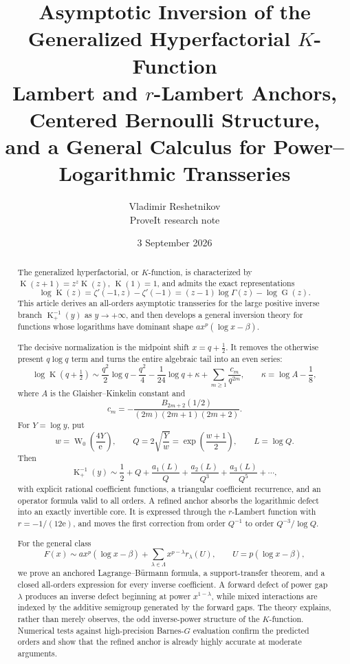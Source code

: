 \documentclass[11pt,oneside]{article}
\theoremstyle{plain}
\theoremstyle{definition}
\theoremstyle{remark}
\newcommand{\Kfun}{\operatorname{K}}
\newcommand{\Gfun}{\operatorname{G}}
\newcommand{\W}{\operatorname{W}}
\newcommand{\e}{\mathrm{e}}
\begin{document}
\title{\textbf{Asymptotic Inversion of the Generalized Hyperfactorial \(K\)-Function}\\[0.4em]
  \Large Lambert and \(r\)-Lambert Anchors, Centered Bernoulli Structure,\\
  and a General Calculus for Power--Logarithmic Transseries}
\author{Vladimir Reshetnikov\\
  \small ProveIt research note}
\date{3 September 2026}
\maketitle

\begin{abstract}
The generalized hyperfactorial, or \(K\)-function, is characterized by
\(\Kfun(z+1)=z^z\Kfun(z)\), \(\Kfun(1)=1\), and admits the exact representations
\[
 \log\Kfun(z)=\zeta'(-1,z)-\zeta'(-1)
 =(z-1)\log\Gamma(z)-\log\Gfun(z).
\]
This article derives an all-orders asymptotic transseries for the large positive
inverse branch \(\Kfun_+^{-1}(y)\) as \(y\to+\infty\), and then develops a
general inversion theory for functions whose logarithms have dominant shape
\(a x^p(\log x-\beta)\).

The decisive normalization is the midpoint shift \(x=q+\tfrac12\).  It removes
the otherwise present \(q\log q\) term and turns the entire algebraic tail into
an even series:
\[
 \log\Kfun\!\left(q+\tfrac12\right)
 \sim \frac{q^2}{2}\log q-\frac{q^2}{4}
      -\frac1{24}\log q+\kappa
      +\sum_{m\ge1}\frac{c_m}{q^{2m}},
 \qquad \kappa=\log A-\frac18,
\]
where \(A\) is the Glaisher--Kinkelin constant and
\[
 c_m=-\frac{B_{2m+2}(1/2)}{(2m)(2m+1)(2m+2)}.
\]
For \(Y=\log y\), put
\[
 w=\W_0\!\left(\frac{4Y}{\e}\right),\qquad
 Q=2\sqrt{\frac{Y}{w}}=\exp\!\left(\frac{w+1}{2}\right),
 \qquad L=\log Q.
\]
Then
\[
 \Kfun_+^{-1}(y)
 \sim \frac12+Q+\frac{a_1(L)}{Q}
 +\frac{a_2(L)}{Q^3}+\frac{a_3(L)}{Q^5}+\cdots,
\]
with explicit rational coefficient functions, a triangular coefficient
recurrence, and an operator formula valid to all orders.  A refined anchor
absorbs the logarithmic defect into an exactly invertible core.  It is expressed
through the \(r\)-Lambert function with \(r=-1/(12\e)\), and moves the first
correction from order \(Q^{-1}\) to order \(Q^{-3}/\log Q\).

For the general class
\[
 F(x)\sim a x^p(\log x-\beta)
       +\sum_{\lambda\in\Lambda}x^{p-\lambda}r_\lambda(U),
 \qquad U=p(\log x-\beta),
\]
we prove an anchored Lagrange--B\"urmann formula, a support-transfer theorem,
and a closed all-orders expression for every inverse coefficient.  A forward
defect of power gap \(\lambda\) produces an inverse defect beginning at power
\(x^{1-\lambda}\), while mixed interactions are indexed by the additive
semigroup generated by the forward gaps.  The theory explains, rather than
merely observes, the odd inverse-power structure of the \(K\)-function.
Numerical tests against high-precision Barnes-\(G\) evaluation confirm the
predicted orders and show that the refined anchor is already highly accurate at
moderate arguments.
\end{abstract}
\end{document}
